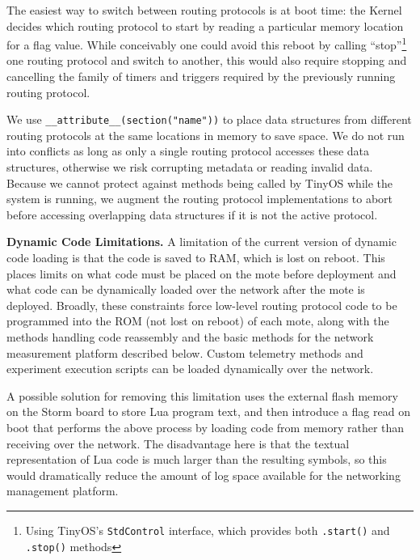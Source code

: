 The easiest way to switch between routing protocols is at boot time: the Kernel decides which routing protocol to start by reading a particular memory location for a flag value.
While conceivably one could avoid this reboot by calling ``stop''\footnote{Using TinyOS's \texttt{StdControl} interface, which provides both \texttt{.start()} and \texttt{.stop()} methods} one routing protocol and switch to another, this would also require stopping and cancelling the family of timers and triggers required by the previously running routing protocol.

We use \texttt{\_\_attribute\_\_(section("name"))} to place data structures from different routing protocols at the same locations in memory to save space.
We do not run into conflicts as long as only a single routing protocol accesses these data structures, otherwise we risk corrupting metadata or reading invalid data.
Because we cannot protect against methods being called by TinyOS while the system is running, we augment the routing protocol implementations to abort before accessing overlapping data structures if it is not the active protocol.

\textbf{Dynamic Code Limitations.} A limitation of the current version of dynamic code loading is that the code is saved to RAM, which is lost on reboot.
This places limits on what code must be placed on the mote before deployment and what code can be dynamically loaded over the network after the mote is deployed.
Broadly, these constraints force low-level routing protocol code to be programmed into the ROM (not lost on reboot) of each mote, along with the methods handling code reassembly and the basic methods for the network measurement platform described below.
Custom telemetry methods and experiment execution scripts can be loaded dynamically over the network.

A possible solution for removing this limitation uses the external flash memory on the Storm board to store Lua program text, and then introduce a flag read on boot that performs the above process by loading code from memory rather than receiving over the network.
The disadvantage here is that the textual representation of Lua code is much larger than the resulting symbols, so this would dramatically reduce the amount of log space available for the networking management platform.


